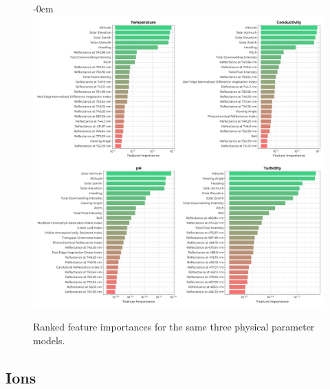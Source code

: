 \documentclass[journal,article,submit,pdftex,moreauthors]{Definitions/mdpi}
\begin{document}
\begin{figure}[H]
\begin{adjustwidth}{-\extralength}{0cm}
\centering
\includegraphics[width=18.0cm]{paper/figures/results/fits/physical-ranking.pdf}
\end{adjustwidth}
\caption{Ranked feature importances for the same three physical parameter models.\label{fig:physical-fit}}
\end{figure}  


\subsection{Ions}
\end{document}
